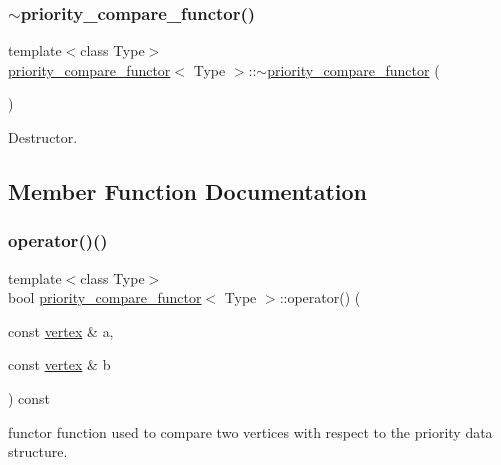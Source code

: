 \subsubsection{\texorpdfstring{$\sim$priority\+\_\+compare\+\_\+functor()}{~priority\_compare\_functor()}}
{\footnotesize\ttfamily template$<$class Type$>$ \\
\hyperlink{structpriority__compare__functor}{priority\+\_\+compare\+\_\+functor}$<$ Type $>$\+::$\sim$\hyperlink{structpriority__compare__functor}{priority\+\_\+compare\+\_\+functor} (\begin{DoxyParamCaption}{ }\end{DoxyParamCaption})\hspace{0.3cm}{\ttfamily [default]}}



Destructor. 



\subsection{Member Function Documentation}
\mbox{\label{structpriority__compare__functor_a3dc526546e2a327dcd3c531a57000802}} 
\subsubsection{\texorpdfstring{operator()()}{operator()()}}
{\footnotesize\ttfamily template$<$class Type$>$ \\
bool \hyperlink{structpriority__compare__functor}{priority\+\_\+compare\+\_\+functor}$<$ Type $>$\+::operator() (\begin{DoxyParamCaption}\item[{const \hyperlink{graph_8hpp_abefdcf0544e601805af44eca032cca14}{vertex} \&}]{a,  }\item[{const \hyperlink{graph_8hpp_abefdcf0544e601805af44eca032cca14}{vertex} \&}]{b }\end{DoxyParamCaption}) const\hspace{0.3cm}{\ttfamily [inline]}}



functor function used to compare two vertices with respect to the priority data structure. 


